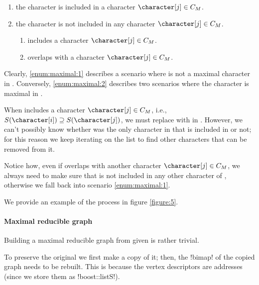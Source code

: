\begin{enumerate}[label=\textbf{S.\arabic*}, ref=S.\arabic*]
  \item \label{enum:maximal:1} the character \character[i] is included in a character $\character[j] \in \cm{}$.

  \item \label{enum:maximal:2} the character \character[i] is not included in any character $\character[j] \in \cm{}$.
  \begin{enumerate}
    \item \label{enum:maximal:2:b} \character[i] includes a character $\character[j] \in \cm{}$.

    \item \label{enum:maximal:2:a} \character[i] overlaps with a character $\character[j] \in \cm{}$.
  \end{enumerate}
\end{enumerate}

Clearly, \ref{enum:maximal:1} describes a scenario where \character[i] is not a maximal character in \grb{}. Conversely, \ref{enum:maximal:2} describes two scenarios where the character \character[i] is maximal in \grb{}.

When \character[i] includes a character $\character[j] \in \cm{}$, i.e., $S(\character[i]) \supseteq S(\character[j])$, we must replace \character[j] with \character[i] in \cm{}.
However, we can't possibly know whether \character[j] was the only character in \cm{} that is included in \character[i] or not; for this reason we keep iterating on the list \cm{} to find other characters that can be removed from it.

Notice how, even if \character[i] overlaps with another character $\character[j] \in \cm{}$, we always need to make sure that \character[i] is not included in any other character of \cm{}, otherwise we fall back into scenario \ref{enum:maximal:1}.

We provide an example of the process in figure \ref{figure:5}.

\paragraph{Maximal reducible graph}

Building a maximal reducible graph \grbcm{} from \grb{} given \cm{} is rather trivial.

To preserve the original \grb{} we first make a copy of it; then, the !bimap! of the copied graph needs to be rebuilt.
This is because the vertex descriptors are addresses (since we store them as !boost::listS!).

